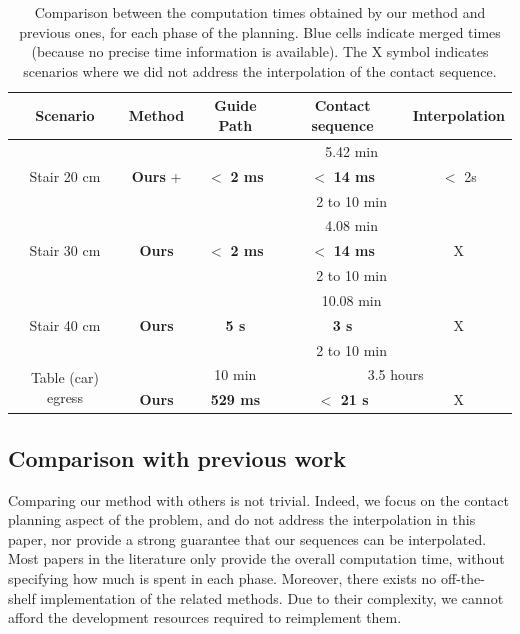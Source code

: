 \begin{table}
\centering
\begin{tabular}{ c | c | c | c | c }
 Scenario & Method  & Guide Path & Contact sequence & Interpolation \\
 \hline
   \multirow{3}{*}{Stair 20 cm} & \citeauthor{Hauser06usingmotion} &  \multicolumn{3}{c}{\cellcolor{blue!25}5.42 min}  \\
							 & \textbf{Ours} + \citeauthor{Carpentier2016}  & $\mathbf{<}$ \textbf{2 ms} & $\mathbf{<}$ \textbf{14 ms} & $ <$ 2s \\
							 & \citeauthor{Mordatch:2012:DCB:2185520.2185539} &  \multicolumn{3}{c}{\cellcolor{blue!25}2 to 10 min} \\
 \hline
   \multirow{3}{*}{Stair 30 cm} & \citeauthor{Hauser06usingmotion} &  \multicolumn{3}{c}{\cellcolor{blue!25}4.08 min}  \\
							 & \textbf{Ours}  & $\mathbf{<}$ \textbf{2 ms} & $\mathbf{<}$ \textbf{14 ms} & X \\
							 & \citeauthor{Mordatch:2012:DCB:2185520.2185539} &  \multicolumn{3}{c}{\cellcolor{blue!25}2 to 10 min} \\
 \hline
   \multirow{3}{*}{Stair 40 cm} & \citeauthor{Hauser06usingmotion} &  \multicolumn{3}{c}{\cellcolor{blue!25}10.08 min}  \\
							 & \textbf{Ours}  & \textbf{5 s} & \textbf{3 s} & X \\
							 & \citeauthor{Mordatch:2012:DCB:2185520.2185539} &  \multicolumn{3}{c}{\cellcolor{blue!25}2 to 10 min} \\
 \hline
   \multirow{2}{*}{Table (car) egress} & \citeauthor{Bouyarmane2009, DBLP:conf/iser/EscandeKMG08} & 10 min & \multicolumn{2}{c}{\cellcolor{blue!25}3.5 hours}  \\
							 & \textbf{Ours}  & \textbf{529 ms} & \textbf{$<$ 21 s} & X \\
 \end{tabular}
\caption{Comparison between the computation times obtained by our method and previous ones, for each phase of the planning. Blue cells indicate merged times (because no
precise time information is available). The X symbol indicates scenarios where we did not address the interpolation of the contact sequence.}
\label{tab:compprev}
\quad
\end{table}
\subsection{Comparison with previous work} \label{sec:compa}
Comparing our method with others is not trivial. Indeed, we focus on the contact planning aspect of the problem, and do not address
the interpolation in this paper, nor provide a strong guarantee that our sequences can be interpolated.
Most papers in the literature only provide the overall computation
time, without specifying how much is spent in each phase. Moreover, there exists no off-the-shelf implementation
of the related methods. Due to their complexity, we cannot afford the development resources required to reimplement them.

